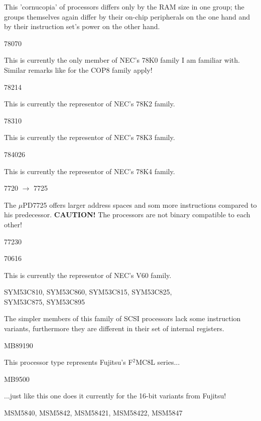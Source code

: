 \documentclass[12pt,twoside]{report}
\begin{document}
This 'cornucopia' of processors differs only by the RAM size in one
group; the groups themselves again differ by their on-chip
peripherals on the one hand and by their instruction set's power on
the other hand.
\begin{cpulist}
   78070
\end{cpulist}
This is currently the only member of NEC's 78K0 family I am familiar
with.  Similar remarks like for the COP8 family apply!
\begin{cpulist}
   78214
\end{cpulist}
This is currently the representor of NEC's 78K2 family.
\begin{cpulist}
   78310
\end{cpulist}
This is currently the representor of NEC's 78K3 family.
\begin{cpulist}
   784026
\end{cpulist}
This is currently the representor of NEC's 78K4 family.
\begin{cpulist}
   7720 $\rightarrow$ 7725
\end{cpulist}
The $\mu$PD7725 offers larger address spaces and som more instructions
compared to his predecessor. {\bf CAUTION!}  The processors are not binary
compatible to each other!
\begin{cpulist}
   77230
\end{cpulist}
\begin{cpulist}
   70616
\end{cpulist}
This is currently the representor of NEC's V60 family.
\begin{cpulist}
   SYM53C810, SYM53C860, SYM53C815, SYM53C825, \\
\> SYM53C875, SYM53C895
\end{cpulist}
The simpler members of this family of SCSI processors lack some
instruction variants, furthermore they are different in their set of
internal registers.
\begin{cpulist}
   MB89190
\end{cpulist}
This processor type represents Fujitsu's F$^{2}$MC8L series...
\begin{cpulist}
   MB9500
\end{cpulist}
...just like this one does it currently for the 16-bit variants from
Fujitsu!
\begin{cpulist}
   MSM5840, MSM5842, MSM58421, MSM58422, MSM5847
\end{cpulist}
\end{document}
